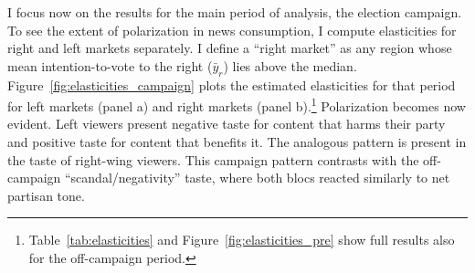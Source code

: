 \documentclass[12pt]{article}
\begin{document}
	
		 I focus now on the results for the main period of analysis, the election campaign. To see the extent of polarization in news consumption, I  compute elasticities for right and left markets separately. I define a “right market” as any region whose mean intention-to-vote to the right  ($\bar{y}_r$) lies above the median.  Figure~\ref{fig:elasticities_campaign} plots the estimated elasticities for that period for left markets (panel a) and right markets (panel b).\footnote{Table~\ref{tab:elasticities} and 	 Figure~\ref{fig:elasticities_pre} show full results also for the off-campaign period. }	Polarization becomes now evident. Left viewers present negative taste for content that harms their party and positive taste for content that benefits it. The analogous pattern is present in the taste of right-wing viewers. This campaign pattern contrasts with the off-campaign “scandal/negativity” taste, where both blocs reacted similarly to net partisan tone.
	 
	 
	 
\end{document}
